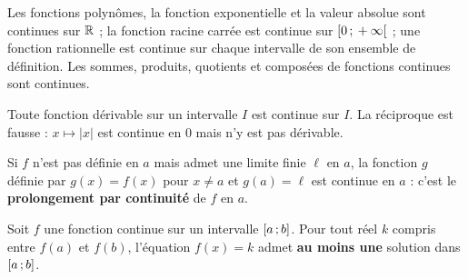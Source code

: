 \begin{propriete}
Les fonctions polynômes, la fonction exponentielle et la valeur absolue sont continues sur $\mathbb{R}$ ; la fonction racine carrée
est continue sur $\mathopen{[}0\,{;}\,+\infty\mathclose{[}$ ; une fonction rationnelle est continue sur chaque intervalle de son ensemble de
définition. Les sommes, produits, quotients et composées de fonctions continues sont continues.
\end{propriete}

\begin{theoreme}
Toute fonction dérivable sur un intervalle $I$ est continue sur $I$. La réciproque est fausse : $x\mapsto|x|$ est
continue en $0$ mais n'y est pas dérivable.
\end{theoreme}

\begin{savoirfaire}
Si $f$ n'est pas définie en $a$ mais admet une limite finie $\ell$ en $a$, la fonction $g$ définie par $g(x)=f(x)$ pour
$x\neq a$ et $g(a)=\ell$ est continue en $a$ : c'est le \textbf{prolongement par continuité} de $f$ en $a$.
\end{savoirfaire}


\begin{theoreme}
Soit $f$ une fonction continue sur un intervalle $\mathopen{[}a\,{;}\,b\mathclose{]}$. Pour tout réel $k$ compris entre $f(a)$ et $f(b)$,
l'équation $f(x)=k$ admet \textbf{au moins une} solution dans $\mathopen{[}a\,{;}\,b\mathclose{]}$.
\end{theoreme}

